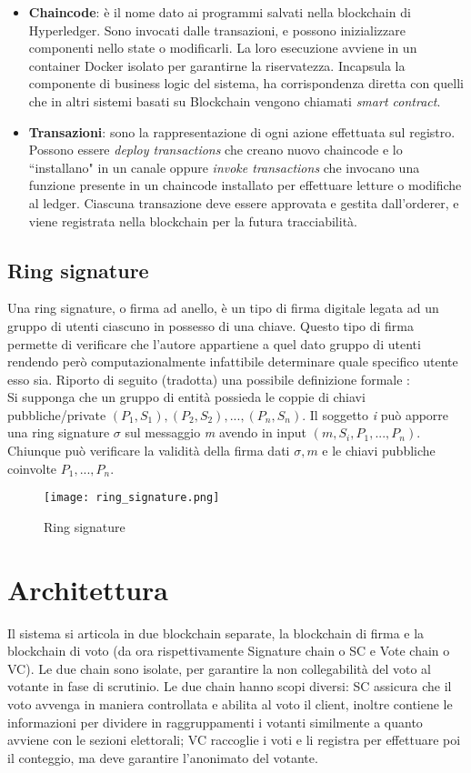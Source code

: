 \begin{itemize}
				\item \textbf{Chaincode}: è il nome dato ai programmi salvati nella blockchain di Hyperledger. Sono invocati dalle transazioni, e possono inizializzare componenti nello state o modificarli. La loro esecuzione avviene in un container Docker isolato per garantirne la riservatezza. Incapsula la componente di business logic del sistema, ha corrispondenza diretta con quelli che in altri sistemi basati su Blockchain vengono chiamati \emph{smart contract}.
				\item \textbf{Transazioni}: sono la rappresentazione di ogni azione effettuata sul registro. Possono essere \emph{deploy transactions} che creano nuovo chaincode e lo ``installano" in un canale oppure \emph{invoke transactions} che invocano una funzione presente in un chaincode installato per effettuare letture o modifiche al ledger. Ciascuna transazione deve essere approvata e gestita dall'orderer, e viene registrata nella blockchain per la futura tracciabilità.
			\end{itemize}
		
	\subsection{Ring signature}
		Una ring signature, o firma ad anello, è un tipo di firma digitale legata ad un gruppo di utenti ciascuno in possesso di una chiave. Questo tipo di firma permette di verificare che l'autore appartiene a quel dato gruppo di utenti rendendo però computazionalmente infattibile determinare quale specifico utente esso sia. Riporto di seguito (tradotta) una possibile definizione formale \cite{ring_signature}: \\
		Si supponga che un gruppo di entità possieda le coppie di chiavi pubbliche/private $(P_1, S_1), (P_2, S_2), ..., (P_n, S_n)$. Il soggetto \emph{i} può apporre una ring signature $\sigma$ sul messaggio \emph{m} avendo in input $(m, S_i, P_1, ..., P_n)$. Chiunque può verificare la validità della firma dati $\sigma, m$ e le chiavi pubbliche coinvolte $P_1, ..., P_n$.
		\begin{figure}[ht]
			\centering
			\texttt{[image: ring\_signature.png]}
			\caption{Ring signature}
			\label{fig:ring_signature}
		\end{figure}


\section{Architettura}
	Il sistema si articola in due blockchain separate, la blockchain di firma e la blockchain di voto (da ora rispettivamente Signature chain o SC e Vote chain o VC). Le due chain sono isolate, per garantire la non collegabilità del voto al votante in fase di scrutinio.
	Le due chain hanno scopi diversi: SC assicura che il voto avvenga in maniera controllata e abilita al voto il client, inoltre contiene le informazioni per dividere in raggruppamenti i votanti similmente a quanto avviene con le sezioni elettorali; VC raccoglie i voti e li registra per effettuare poi il conteggio, ma deve garantire l’anonimato del votante.
	
